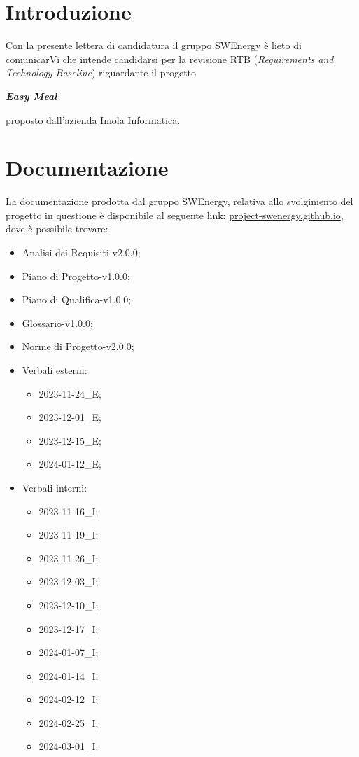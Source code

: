 \section{Introduzione}

Con la presente lettera di candidatura il gruppo SWEnergy è lieto di comunicarVi
che intende candidarsi per la revisione RTB (\textit{Requirements and Technology
	Baseline}) riguardante il progetto

\begin{center}
	\textbf{\textit{Easy Meal}}
\end{center}

\noindent
proposto dall'azienda \href{https://imolainformatica.it/}{Imola Informatica}.

\section{Documentazione}

La documentazione prodotta dal gruppo SWEnergy, relativa allo svolgimento del
progetto in questione è disponibile al seguente link:
\href{https://project-swenergy.github.io/}{project-swenergy.github.io},
dove è possibile trovare:
\begin{itemize}
	\item Analisi dei Requisiti-v2.0.0;
	\item Piano di Progetto-v1.0.0;
	\item Piano di Qualifica-v1.0.0;
	\item Glossario-v1.0.0;
	\item Norme di Progetto-v2.0.0;

	\item Verbali esterni:
	      \begin{itemize}
		      \item 2023-11-24\_E;
		      \item 2023-12-01\_E;
		      \item 2023-12-15\_E;
		      \item 2024-01-12\_E;
	      \end{itemize}

	\item Verbali interni:
	      \begin{itemize}
		      \item 2023-11-16\_I;
		      \item 2023-11-19\_I;
		      \item 2023-11-26\_I;
		      \item 2023-12-03\_I;
		      \item 2023-12-10\_I;
		      \item 2023-12-17\_I;
		      \item 2024-01-07\_I;
		      \item 2024-01-14\_I;
		      \item 2024-02-12\_I;
		      \item 2024-02-25\_I;
		      \item 2024-03-01\_I.
	      \end{itemize}
\end{itemize}

